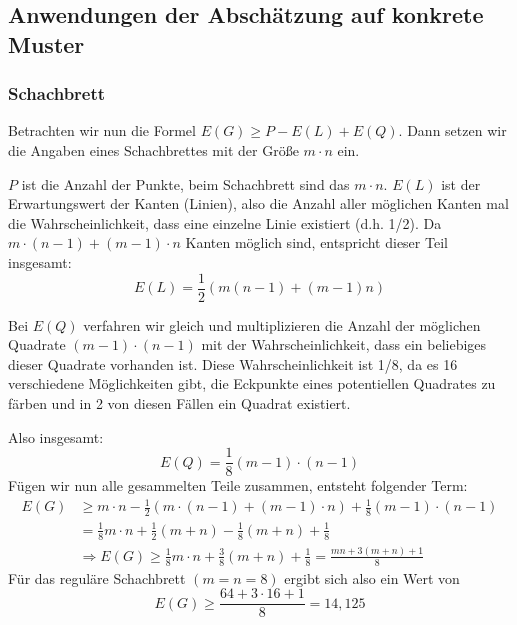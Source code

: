 \documentclass[11pt,a4paper]{article}
\numberwithin{equation}{section}
\numberwithin{table}{section}
\numberwithin{figure}{section}
\begin{document}
\subsection{Anwendungen der Abschätzung auf konkrete Muster}
\subsubsection{Schachbrett}
Betrachten wir nun die Formel $E(G)\geq P-E(L)+E(Q)$. Dann setzen wir die Angaben eines Schachbrettes mit der Größe $m\cdot n$ ein.\par\noindent
$P$ ist die Anzahl der Punkte, beim Schachbrett sind das $m\cdot n$.
$E(L)$ ist der Erwartungswert der Kanten (Linien), also die Anzahl aller möglichen Kanten mal die Wahrscheinlichkeit, dass eine einzelne Linie existiert (d.h. 1/2). Da $m\cdot(n-1)+(m-1)\cdot n$ Kanten möglich sind, entspricht dieser Teil insgesamt:
$$E(L)=\frac{1}{2}(m(n-1)+(m-1)n)$$ \par \noindent
Bei $E(Q)$ verfahren wir gleich und multiplizieren die Anzahl der möglichen Quadrate
$ (m-1)\cdot(n-1)$ mit der Wahrscheinlichkeit, dass ein beliebiges dieser Quadrate vorhanden ist. Diese Wahrscheinlichkeit ist 1/8, da es 16 verschiedene Möglichkeiten gibt, die Eckpunkte eines potentiellen Quadrates zu färben und in 2 von diesen Fällen ein Quadrat existiert. \par\noindent
Also insgesamt: 
$$E(Q)=\frac{1}{8}(m-1)\cdot(n-1)$$
Fügen wir nun alle gesammelten Teile zusammen, entsteht folgender Term:
\begin{align*}
E(G)&\geq m\cdot n-\frac{1}{2} (m\cdot(n-1)+(m-1)\cdot n)+\frac{1}{8} (m-1)\cdot(n-1)  \\
&=\frac{1}{8} m\cdot n+\frac{1}{2} (m+ n)-\frac{1}{8}(m+n)+\frac{1}{8}\\
&\Rightarrow E(G)\geq \frac{1}{8} m \cdot n+\frac{3}{8}(m+n)+\frac{1}{8}=\frac{mn+3(m+n)+1}{8}
\end{align*}
Für das reguläre Schachbrett $(m=n=8)$ ergibt sich also ein Wert von $$E(G)\geq \frac{64+3\cdot 16+1}{8}=14,125$$
\end{document}

